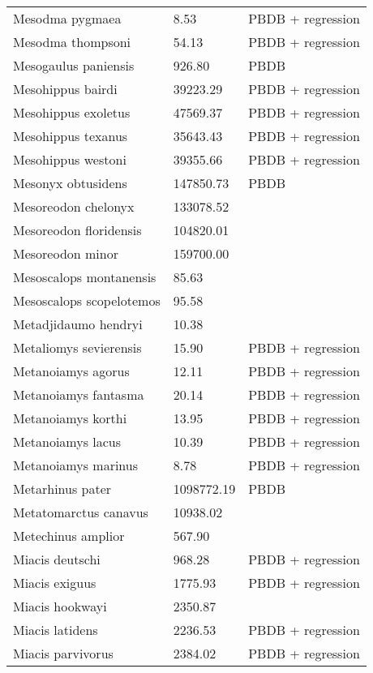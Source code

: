 \documentclass{article}
\begin{document}
\begin{center}
\begin{longtable}{p{} p{} p{}}
    Mesodma pygmaea & 8.53 & PBDB + regression \\ 
    Mesodma thompsoni & 54.13 & PBDB + regression \\ 
    Mesogaulus paniensis & 926.80 & PBDB \\ 
    Mesohippus bairdi & 39223.29 & PBDB + regression \\ 
    Mesohippus exoletus & 47569.37 & PBDB + regression \\ 
    Mesohippus texanus & 35643.43 & PBDB + regression \\ 
    Mesohippus westoni & 39355.66 & PBDB + regression \\ 
    Mesonyx obtusidens & 147850.73 & PBDB \\ 
    Mesoreodon chelonyx & 133078.52 & \cite{Bever2003} \\ 
    Mesoreodon floridensis & 104820.01 & \cite{Tomiya2013} \\ 
    Mesoreodon minor & 159700.00 & \cite{McKenna2011} \\ 
    Mesoscalops montanensis & 85.63 & \cite{Tomiya2013} \\ 
    Mesoscalops scopelotemos & 95.58 & \cite{Tomiya2013} \\ 
    Metadjidaumo hendryi & 10.38 & \cite{Tomiya2013} \\ 
    Metaliomys sevierensis & 15.90 & PBDB + regression \\ 
    Metanoiamys agorus & 12.11 & PBDB + regression \\ 
    Metanoiamys fantasma & 20.14 & PBDB + regression \\ 
    Metanoiamys korthi & 13.95 & PBDB + regression \\ 
    Metanoiamys lacus & 10.39 & PBDB + regression \\ 
    Metanoiamys marinus & 8.78 & PBDB + regression \\ 
    Metarhinus pater & 1098772.19 & PBDB \\ 
    Metatomarctus canavus & 10938.02 & \cite{Tomiya2013} \\ 
    Metechinus amplior & 567.90 & \cite{Tedford1994} \\ 
    Miacis deutschi & 968.28 & PBDB + regression \\ 
    Miacis exiguus & 1775.93 & PBDB + regression \\ 
    Miacis hookwayi & 2350.87 & \cite{Patton1973} \\ 
    Miacis latidens & 2236.53 & PBDB + regression \\ 
    Miacis parvivorus & 2384.02 & PBDB + regression \\ 

\end{longtable}
\end{center}
\end{document}

